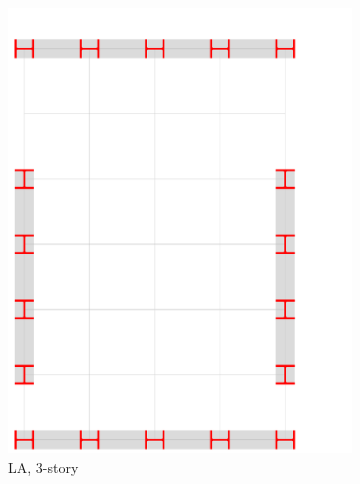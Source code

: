 \documentclass[onecolumn, fleqn]{article}
\begin{document}
\begin{figure}[H]
\begin{subfigure}[b]{0.24\linewidth}
		\centering \includegraphics[page=3,trim=0mm 0mm 32mm 17mm,clip,scale=0.2]{moment_frames.pdf}
		\caption{LA, 3-story}
	\end{subfigure}
	\begin{subfigure}[b]{0.24\linewidth}

\end{subfigure}
\end{figure}
\end{document}
